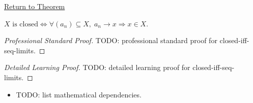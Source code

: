 \newpage
{}
\label{prf:closed-iff-seq-limits}

\begin{remark*}[Return]
\hyperref[cor:closed-iff-seq-limits]{Return to Theorem}
\end{remark*}

\begin{theorem*}
$X\text{ is closed} \iff \forall (a_n)\subseteq X,\;
a_n \to x \Rightarrow x \in X$.

\smallskip\noindent
\end{theorem*}

\begin{proof}[Professional Standard Proof]
\LRAProofBodyStart
TODO: professional standard proof for closed-iff-seq-limits.
\end{proof}

\begin{proof}[Detailed Learning Proof]
\LRAProofBodyStart
TODO: detailed learning proof for closed-iff-seq-limits.
\end{proof}

\begin{remark*}
\end{remark*}

\begin{dependencies}
\begin{itemize}
  \item TODO: list mathematical dependencies.
\end{itemize}
\end{dependencies}

\clearpage
